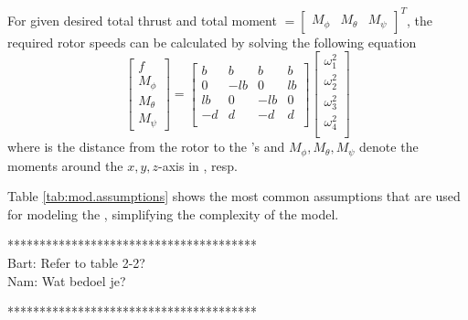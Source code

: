 For given desired total thrust  and total moment $=\begin{bmatrix}	M_\phi&M_\theta&M_\psi	\end{bmatrix}^T  $, the required rotor speeds can be calculated by solving the following equation
\begin{equation}\label{eq:omega_i}
\begin{bmatrix}
f\\M_\phi\\M_\theta\\M_\psi
\end{bmatrix}=
\begin{bmatrix}
b&b&b&b\\
0&-lb&0&lb\\
lb&0&-lb&0\\
-d&d&-d&d\\
\end{bmatrix}
\begin{bmatrix}
\omega_1^2\\
\omega_2^2\\
\omega_3^2\\
\omega_4^2\\
\end{bmatrix}
\end{equation}
where  is the distance from the rotor to the 's  and $ M_\phi, M_\theta, M_\psi $ denote the moments around the $ x, y, z $-axis in \BF, resp. 

Table \ref{tab:mod.assumptions} shows the most common assumptions that are used for modeling the , simplifying the complexity of the model.

***************************************\\
Bart: Refer to table 2-2?\\
Nam: Wat bedoel je?

***************************************\\

